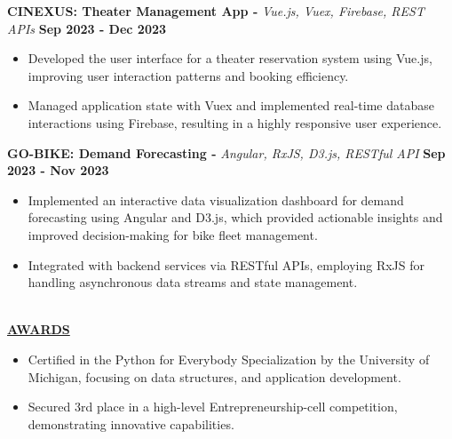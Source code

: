 \documentclass{article}
\begin{document}
\noindent \textbf{CINEXUS: Theater Management App -} \textit{Vue.js, Vuex, Firebase, REST APIs} \hfill \textbf{Sep 2023 - Dec 2023}
\begin{itemize}[noitemsep,nolistsep,leftmargin=*]
\item {\small Developed the user interface for a theater reservation system using Vue.js, improving user interaction patterns and booking efficiency.}
\item {\small Managed application state with Vuex and implemented real-time database interactions using Firebase, resulting in a highly responsive user experience.}
\end{itemize}

\noindent \textbf{GO-BIKE: Demand Forecasting -} \textit{Angular, RxJS, D3.js, RESTful API} \hfill \textbf{Sep 2023 - Nov 2023}
\begin{itemize}[noitemsep,nolistsep,leftmargin=*]
\item {\small Implemented an interactive data visualization dashboard for demand forecasting using Angular and D3.js, which provided actionable insights and improved decision-making for bike fleet management.}
\item {\small Integrated with backend services via RESTful APIs, employing RxJS for handling asynchronous data streams and state management.}
\end{itemize}
\noindent \textbf{\underline{}} \\
\noindent \textbf{\underline{AWARDS}} 
\begin{itemize}[noitemsep,nolistsep,leftmargin=*]
\item {\small  Certified in the Python for Everybody Specialization by the University of Michigan, focusing on data structures, and application development. }
\end{itemize}
\begin{itemize}[noitemsep,nolistsep,leftmargin=*]
\item {\small Secured 3rd place in a high-level Entrepreneurship-cell competition, demonstrating innovative capabilities. }
\end{itemize}


\end{document}
